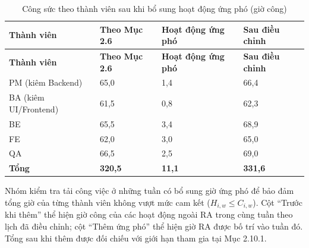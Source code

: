{\small
\begin{longtable}{@{}Y{3.6cm}Y{3.0cm}Y{3.0cm}Y{3.0cm}@{}}
\caption{Công sức theo thành viên sau khi bổ sung hoạt động ứng phó (giờ công)}
\label{tab:p29-person}\\
\toprule
\textbf{Thành viên} &
\textbf{Theo Mục 2.6} &
\textbf{Hoạt động ứng phó} &
\textbf{Sau điều chỉnh} \\
\midrule
\endfirsthead

\toprule
\textbf{Thành viên} &
\textbf{Theo Mục 2.6} &
\textbf{Hoạt động ứng phó} &
\textbf{Sau điều chỉnh} \\
\midrule
\endhead

\bottomrule
\endfoot

PM (kiêm Backend) & 65,0 & 1,4 & 66,4 \\

BA (kiêm UI/Frontend) & 61,5 & 0,8 & 62,3 \\

BE & 65,5 & 3,4 & 68,9 \\

FE & 62,0 & 3,0 & 65,0 \\

QA & 66,5 & 2,5 & 69,0 \\

\midrule
\textbf{Tổng} &
\textbf{320,5} &
\textbf{11,1} &
\textbf{331,6} \\

\end{longtable}
}

Nhóm kiểm tra tải công việc ở những tuần có bổ sung giờ ứng phó để bảo đảm tổng giờ của từng thành viên không vượt mức cam kết ($H_{i,w} \le C_{i,w}$). Cột ``Trước khi thêm'' thể hiện giờ công của các hoạt động ngoài RA trong cùng tuần theo lịch đã điều chỉnh; cột ``Thêm ứng phó'' thể hiện giờ RA được bố trí vào tuần đó. Tổng sau khi thêm được đối chiếu với giới hạn tham gia tại Mục 2.10.1.

